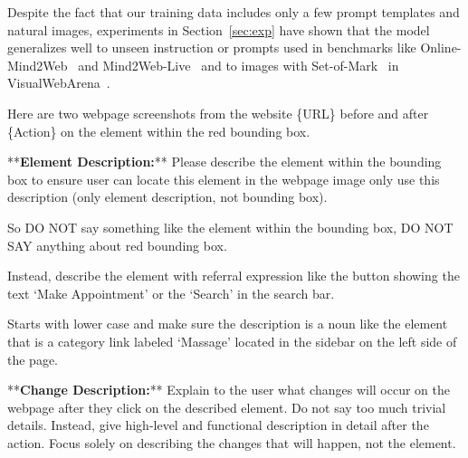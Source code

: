 Despite the fact that our training data includes only a few prompt templates and natural images, experiments in Section~\ref{sec:exp} have shown that the model generalizes well to unseen instruction or prompts used in benchmarks like Online-Mind2Web~\citep{m2wonline} and Mind2Web-Live~\citep{webcanvas} and to images with Set-of-Mark~\citep{yang2023set} in VisualWebArena~\citep{koh2024visualwebarena}.




\newpage
\begin{tcolorbox}[colframe=white!50!black, colback=white!10!white, title=Data Synthesis, breakable]
\small
\label{box:data-synthesis-prompt}

Here are two webpage screenshots from the website \{URL\} before and after \{Action\} on the element within the red bounding box.


\medskip
**\textbf{Element Description:}** Please describe the element within the bounding box to ensure user can locate this element in the webpage image only use this description (only element description, not bounding box).

So DO NOT say something like the element within the bounding box, DO NOT SAY anything about red bounding box.

Instead, describe the element with referral expression like the button showing the text `Make Appointment' or the `Search' in the search bar.

Starts with lower case and make sure the description is a noun like the element that is a category link labeled `Massage' located in the sidebar on the left side of the page.

\medskip
**\textbf{Change Description:}** Explain to the user what changes will occur on the webpage after they click on the described element. Do not say too much trivial details.
Instead, give high-level and functional description in detail after the action.
Focus solely on describing the changes that will happen, not the element.


\end{tcolorbox}






